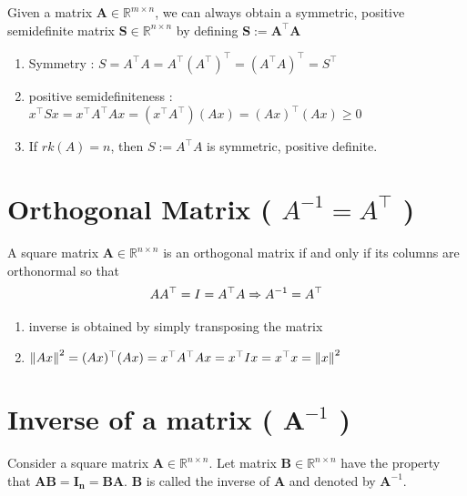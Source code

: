 \begin{theorem}
    Given a matrix $\mathbf{A} \in \mathbb{R}^{m\times n}$, we can always obtain a symmetric, positive semidefinite matrix $\mathbf{S} \in \mathbb{R}^{n\times n}$ by defining $\mathbf{S := A^\top A}$
\end{theorem}

\begin{enumerate}
    \item Symmetry : $S = A^\top A = A^\top (A^\top )^\top  = (A^\top A)^\top  = S^\top$ 

    \item positive semidefiniteness : $x^\top Sx = x^\top A^\top Ax = (x^\top A^\top )(Ax) = (Ax)^\top (Ax) \geq 0$ 

    \item If $rk(A) = n$, then $S := A^\top A$ is symmetric, positive definite.
\end{enumerate}



\section{Orthogonal Matrix ( $A^{-1} = A^\top$ ) \cite{mfml-1}}\label{Orthogonal Matrix}
A square matrix $\mathbf{A} \in \mathbb{R}^{n\times n}$ is an orthogonal matrix if and only if its columns are orthonormal so that 
\[
    \hfill
    AA^\top  = I = A^\top A  
    \Rightarrow  A^{-1} = A^\top 
    \hfill
\]

\begin{enumerate}
    \item inverse is obtained by simply transposing the matrix

    \item $
        \left\| Ax \right\|^2 
        = (Ax)^\top (Ax) 
        = x^\top A^\top Ax 
        = x^\top Ix 
        = x^\top x 
        = \left\| x \right\|^2
    $
\end{enumerate}


\section{Inverse of a matrix ( $\mathbf{A}^{-1}$ ) \cite{mfml-1}}\label{Inverse of a matrix}

Consider a square matrix $\mathbf{A} \in \mathbb{R}^{n\times n}$. Let matrix $\mathbf{B} \in \mathbb{R}^{n\times n}$ have the property that $\mathbf{AB = I_n = BA}$. $\mathbf{B}$ is called the inverse of $\mathbf{A}$ and denoted by $\mathbf{A}^{-1}$.

